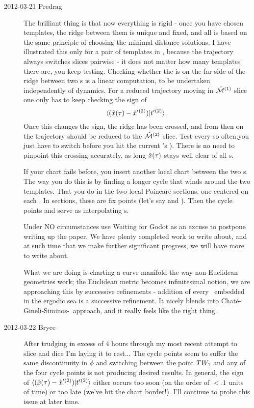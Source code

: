 \begin{description}
\item[2012-03-21 Predrag~~]
The brilliant thing is that now everything is rigid - once you have
chosen templates, the ridge between them is unique and fixed, and all is
based on the same principle of choosing the minimal distance solutions. I
have illustrated this only for a pair of templates in
, because the trajectory always switches slices
pairwise - it does not matter how many templates there are, you keep
testing. Checking whether the {\chartBord} is on the far side of
the ridge between two \slice s is a linear computation, to be undertaken
independently of dynamics. For a reduced trajectory moving in
$\hat{\cal M}{}^{(1)}$ slice one only has to keep checking the sign of
\[
\braket{(\sspRed(\zeit)- \slicep{}^{(2)})}{\sliceTan{}{}^{(2)}}
\,.
\]
Once this changes the sign, the ridge has been crossed, and from then on
the trajectory should be reduced to the $\hat{\cal M}{}^{(2)}$ slice. Test
every so often,you just have to switch before you hit the current
\template's {\chartBord}). There is no need to pinpoint this crossing
accurately, as long $\hat{x}(\tau)$ stays well clear of all \chartBord
s.

If your chart fails before, you insert another local chart between the
two \template s. The way you do this is by finding a longer cycle that
winds around the two templates. That you do in the two local Poincar\'e
sections, one centered on each \template. In sections, these are fix
points (let's say  and ). Then the cycle points
 and   serve as interpolating \template s.

Under {\color{red} NO circumstances} use
 {Waiting
for Godot} as an excuse to postpone writing up the paper. We have plenty
completed work to write about, and at such time that we make further
significant progress, we will have more to write about.

What we are doing is charting a curve manifold the way non-Euclidean
geometries work; the Euclidean metric becomes infinitesimal notion, we
are approaching this by successive refinements - addition of every \po\
embedded in the ergodic sea is a successive refinement. It nicely blends
into Chat\'e-Gineli-Siminos-\etal\ approach, and it really feels like the
right thing.

\item[2012-03-22 Bryce]
After trudging in excess of 4 hours through my most recent attempt to
slice and dice I'm laying it to rest... The cycle points seem to suffer
the same discontinuity in $\dot{\phi}$ and switching between the
{\reqv} point $TW_{1}$ and any of the four cycle points is not
producing desired results. In general, the sign of
$\langle(\hat{x}(\tau)- {\hat{x}'}{}^{(2)})|t'_{}{}^{(2)}\rangle$
either occurs too soon (on the order of $<.1$ units of time)  or too late
(we've hit the chart border!). I'll continue to probe this issue at later
time.


\end{description}
